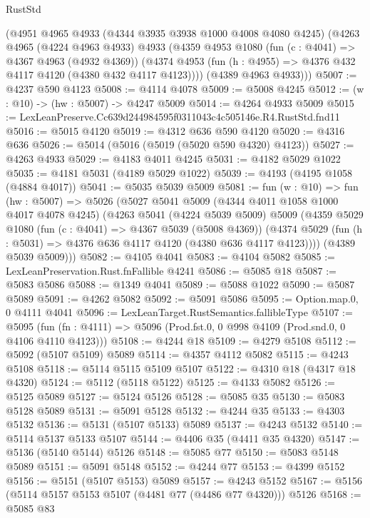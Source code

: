 \begin{lexlean}{RustStd}
\begin{coremodule}
    (@4951
      @4965
      @4933
      (@4344 @3935 @3938 @1000 @4008 @4080 @4245)
      (@4263
        @4965
        (@4224 @4963 @4933)
        @4933
        (@4359
          @4953
          @1080
          (fun (c : @4041) => @4367 @4963 (@4932 @4369))
          (@4374 @4953 (fun (h : @4955) => @4376 @432 @4117 @4120 (@4380 @432 @4117 @4123))))
        (@4389 @4963 @4933)))
@5007 := @4237 @590 @4123
@5008 := @4114 @4078
@5009 := @5008 @4245
@5012 := (w : @10) -> (hw : @5007) -> @4247 @5009
@5014 := @4264 @4933 @5009
@5015 := LexLeanPreserve.Cc639d244984595f0311043c4c505146e.R4.RustStd.fnd11
@5016 := @5015 @4120
@5019 := @4312 @636 @590 @4120
@5020 := @4316 @636
@5026 := @5014 (@5016 (@5019 (@5020 @590 @4320) @4123))
@5027 := @4263 @4933
@5029 := @4183 @4011 @4245
@5031 := @4182 @5029 @1022
@5035 := @4181 @5031 (@4189 @5029 @1022)
@5039 := @4193 (@4195 @1058 (@4884 @4017))
@5041 := @5035 @5039 @5009
@5081 := fun (w : @10) =>
  fun (hw : @5007) =>
  @5026
    (@5027
      @5041
      @5009
      (@4344 @4011 @1058 @1000 @4017 @4078 @4245)
      (@4263
        @5041
        (@4224 @5039 @5009)
        @5009
        (@4359
          @5029
          @1080
          (fun (c : @4041) => @4367 @5039 (@5008 @4369))
          (@4374 @5029 (fun (h : @5031) => @4376 @636 @4117 @4120 (@4380 @636 @4117 @4123))))
        (@4389 @5039 @5009)))
@5082 := @4105 @4041
@5083 := @4104 @5082
@5085 := LexLeanPreservation.Rust.fnFallible @4241
@5086 := @5085 @18
@5087 := @5083 @5086
@5088 := @1349 @4041
@5089 := @5088 @1022
@5090 := @5087 @5089
@5091 := @4262 @5082
@5092 := @5091 @5086
@5095 := Option.map.{0, 0} @4111 @4041
@5096 := LexLeanTarget.RustSemantics.fallibleType
@5107 := @5095
    (fun (fn : @4111) => @5096 (Prod.fst.{0, 0} @998 @4109 (Prod.snd.{0, 0} @4106 @4110 @4123)))
@5108 := @4244 @18
@5109 := @4279 @5108
@5112 := @5092 (@5107 @5109) @5089
@5114 := @4357 @4112 @5082
@5115 := @4243 @5108
@5118 := @5114 @5115 @5109 @5107
@5122 := @4310 @18 (@4317 @18 @4320)
@5124 := @5112 (@5118 @5122)
@5125 := @4133 @5082
@5126 := @5125 @5089
@5127 := @5124 @5126
@5128 := @5085 @35
@5130 := @5083 @5128 @5089
@5131 := @5091 @5128
@5132 := @4244 @35
@5133 := @4303 @5132
@5136 := @5131 (@5107 @5133) @5089
@5137 := @4243 @5132
@5140 := @5114 @5137 @5133 @5107
@5144 := @4406 @35 (@4411 @35 @4320)
@5147 := @5136 (@5140 @5144) @5126
@5148 := @5085 @77
@5150 := @5083 @5148 @5089
@5151 := @5091 @5148
@5152 := @4244 @77
@5153 := @4399 @5152
@5156 := @5151 (@5107 @5153) @5089
@5157 := @4243 @5152
@5167 := @5156 (@5114 @5157 @5153 @5107 (@4481 @77 (@4486 @77 @4320))) @5126
@5168 := @5085 @83

\end{coremodule}
\end{lexlean}
